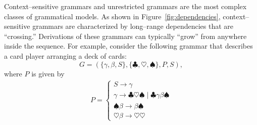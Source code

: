 Context--sensitive grammars and unrestricted grammars are the most
complex classes of grammatical models.  As shown in
Figure~\vref{fig:dependencies}, context--sensitive grammars are
characterized by long--range dependencies that are ``crossing.''
Derivations of these grammars can typically ``grow'' from anywhere
inside the sequence.  For example, consider the following grammar
that describes a card player arranging a deck of cards:
\begin{equation}\label{eqn:csGrammar}
    G = (\{\gamma, \beta, S\},\{\clubsuit, \heartsuit, \spadesuit\},P,S),
\end{equation}
where $P$ is given by
\begin{align}\label{eqn:csProduction}
    P =
    \begin{cases}
    S \rightarrow \gamma \\
    \gamma \rightarrow \clubsuit\heartsuit\spadesuit \mid \clubsuit\gamma\beta\spadesuit \\
    \spadesuit\beta \rightarrow \beta\spadesuit \\
    \heartsuit\beta \rightarrow \heartsuit\heartsuit
    \end{cases}
\end{align}

